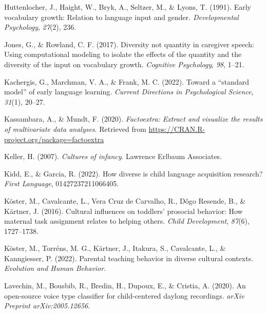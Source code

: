 \documentclass[
  man,floatsintext]{apa6}
\newlength{\cslhangindent}
\newlength{\cslentryspacingunit} %
\newenvironment{CSLReferences}[2] %
 {%
  \setlength{\parindent}{0pt}
  \ifodd #1
  \let\oldpar\par
  \def\par{\hangindent=\cslhangindent\oldpar}
  \fi
  \setlength{\parskip}{#2\cslentryspacingunit}
 }%
 {}
\begin{document}
\begin{CSLReferences}{1}{0}
\leavevmode{}%
Huttenlocher, J., Haight, W., Bryk, A., Seltzer, M., \& Lyons, T. (1991). Early vocabulary growth: Relation to language input and gender. \emph{Developmental Psychology}, \emph{27}(2), 236.

\leavevmode{}%
Jones, G., \& Rowland, C. F. (2017). Diversity not quantity in caregiver speech: Using computational modeling to isolate the effects of the quantity and the diversity of the input on vocabulary growth. \emph{Cognitive Psychology}, \emph{98}, 1--21.

\leavevmode{}%
Kachergis, G., Marchman, V. A., \& Frank, M. C. (2022). Toward a {``standard model''} of early language learning. \emph{Current Directions in Psychological Science}, \emph{31}(1), 20--27.

\leavevmode{}%
Kassambara, A., \& Mundt, F. (2020). \emph{Factoextra: Extract and visualize the results of multivariate data analyses}. Retrieved from \url{https://CRAN.R-project.org/package=factoextra}

\leavevmode{}%
Keller, H. (2007). \emph{Cultures of infancy}. Lawrence Erlbaum Associates.

\leavevmode{}%
Kidd, E., \& Garcia, R. (2022). How diverse is child language acquisition research? \emph{First Language}, 01427237211066405.

\leavevmode{}%
Köster, M., Cavalcante, L., Vera Cruz de Carvalho, R., Dôgo Resende, B., \& Kärtner, J. (2016). Cultural influences on toddlers' prosocial behavior: How maternal task assignment relates to helping others. \emph{Child Development}, \emph{87}(6), 1727--1738.

\leavevmode{}%
Köster, M., Torréns, M. G., Kärtner, J., Itakura, S., Cavalcante, L., \& Kanngiesser, P. (2022). Parental teaching behavior in diverse cultural contexts. \emph{Evolution and Human Behavior}.

\leavevmode{}%
Lavechin, M., Bousbib, R., Bredin, H., Dupoux, E., \& Cristia, A. (2020). An open-source voice type classifier for child-centered daylong recordings. \emph{arXiv Preprint arXiv:2005.12656}.


\end{CSLReferences}
\end{document}
